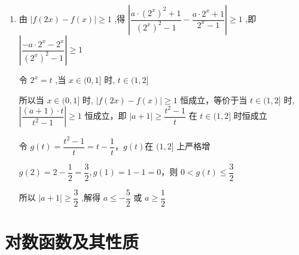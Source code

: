 \begin{enumerate}
\begin{jieda}
\begin{enumerate}
            所以 $\dfrac{\dfrac{{\left( {2}^{x}\right) }^{2} + 1}{{\left( {2}^{x}\right) }^{2} - 1}}{\dfrac{{2}^{x} + 1}{{2}^{x} - 1}} = \dfrac{5}{9}$ ,即 $\dfrac{{\left( {2}^{x}\right) }^{2} + 1}{{\left( {2}^{x} + 1\right) }^{2}} = \dfrac{5}{9}$ 
            
            令 ${2}^{x} = t$ ,则原方程化为 $\dfrac{{t}^{2} + 1}{{\left( t + 1\right) }^{2}} = \dfrac{5}{9}$ ,整理得 $2{t}^{2} - {5t} +$
            $2 = 0$ ,解得 $t = 2$ 或 $t = \dfrac{1}{2}$ ,即 ${2}^{x} = 2$ 或 ${2}^{x} = \dfrac{1}{2}$ ,解得 $x = 1$ 或 $x =  - 1$
            
            当 $x =  - 1$ 时, $\dfrac{{\left( {2}^{x}\right) }^{2} + 1}{{\left( {2}^{x}\right) }^{2} - 1} < 0,\dfrac{{2}^{x} + 1}{{2}^{x} - 1} <0$,故舍去,故原方程的解为 $x = 1$
            
            \item 由 $\left| {f\left( {2x}\right)  - f\left( x\right) }\right|  \geq  1$ ,得 $\left| {\dfrac{a \cdot  {\left( {2}^{x}\right) }^{2} + 1}{{\left( {2}^{x}\right) }^{2} - 1} - \dfrac{a \cdot  {2}^{x} + 1}{{2}^{x} - 1}}\right|  \geq  1$ ,即
            $\left| \dfrac{-a \cdot  {2}^{x} - {2}^{x}}{{\left( {2}^{x}\right) }^{2} - 1}\right|  \geq  1$
            
            令 ${2}^{x} = t$ ,当 $x \in  (0,1\rbrack$ 时, $t \in  (1,2\rbrack$
            
            所以当 $x \in  (0,1\rbrack$ 时,
            $\left| {f\left( {2x}\right)  - f\left( x\right) }\right|  \geq  1$ 恒成立，等价于当 $t \in  (1,2\rbrack$ 时, $\left| \dfrac{\left( {a + 1}\right)  \cdot  t}{{t}^{2} - 1}\right|  \geq  1$ 恒成立，即 $\left| {a + 1}\right|  \geq  \dfrac{{t}^{2} - 1}{t}$ 在
            $t \in  (1,2\rbrack$ 时恒成立
            
            令 $g\left( t\right)  = \dfrac{{t}^{2} - 1}{t} = t - \dfrac{1}{t}$，$g\left( t\right)$在 $(1,2\rbrack$ 上严格增
            
            $g\left( 2\right)  = 2 - \dfrac{1}{2} = \dfrac{3}{2},g\left( 1\right)  = 1 - 1 = 0$，则 $0 < g\left( t\right)  \leq  \dfrac{3}{2}$
            
            所以 $\left| {a + 1}\right|  \geq  \dfrac{3}{2}$ ,解得 $a \leq   - \dfrac{5}{2}$ 或 $a \geq  \dfrac{1}{2}$
        \end{enumerate}
    \end{jieda}
\end{enumerate}

\section*{对数函数及其性质}
